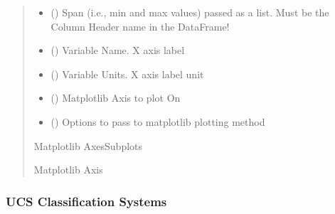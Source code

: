 \documentclass[letterpaper,10pt,english]{sphinxmanual}
\begin{document}
\begin{fulllineitems}
\begin{fulllineitems}
\begin{quote}
\begin{description}
\begin{itemize}
\item {} 
\sphinxAtStartPar
{} (\sphinxstyleliteralemphasis{\sphinxupquote{{[}}}\sphinxstyleliteralemphasis{\sphinxupquote{, }}\sphinxstyleliteralemphasis{\sphinxupquote{{]}}}) \textendash{} Span (i.e., min and max values) passed as a list. Must be the Column Header name in the DataFrame!

\item {} 
\sphinxAtStartPar
{} () \textendash{} Variable Name. X axis label

\item {} 
\sphinxAtStartPar
{} () \textendash{} Variable Units. X axis label unit

\item {} 
\sphinxAtStartPar
{} () \textendash{} Matplotlib Axis to plot On

\item {} 
\sphinxAtStartPar
{} () \textendash{} Options to pass to matplotlib plotting method

\end{itemize}

\sphinxAtStartPar
Matplotlib AxesSubplots

\sphinxAtStartPar
Matplotlib Axis

\end{description}\end{quote}

\end{fulllineitems}


\end{fulllineitems}



\subsubsection{UCS Classification Systems}
\label{\detokenize{pyrockmodulus:module-pyrockmodulus.rock_variables}}\label{\detokenize{pyrockmodulus:ucs-classification-systems}}
\end{document}
